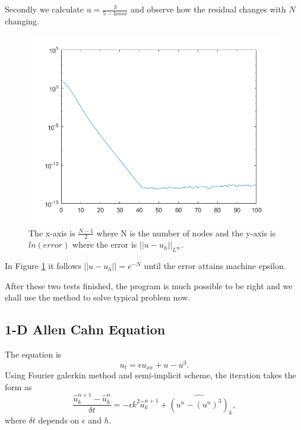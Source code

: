 \documentclass[a4paper]{article}
\begin{document}
Secondly we calculate $u=\frac{3}{5-4cosx}$ and observe how the residual changes with $N$ changing.
\begin{figure}[h]
    \centering
    \includegraphics[scale=0.5]{convergence.png}
    \caption{The x-axis is $\frac{N-1}{2}$ where N is the number of nodes and the y-axis is $ln(error)$ where the error is $||u-u_h||_{L^\infty}$.}
    \label{im::convergence}
\end{figure}

In Figure \ref{im::convergence} it follows $||u-u_h||=e^{-N}$ until the error attains machine epsilon.

After these two tests finished, the program is much possible to be right and we shall use the method to solve typical problem now.

\subsection{1-D Allen Cahn Equation}
The equation is
\begin{equation}
    u_t=\epsilon u_{xx}+u-u^3.
\end{equation}
Using Fourier galerkin method and semi-implicit scheme, the iteration takes the form as
\begin{equation}
    \frac{\hat{u}_k^{n+1}-\hat{u}_k^n}{\delta t}=-\epsilon k^2\hat{u}_k^{n+1}+\hat{(u^n-(u^n)^3)}_k,
\end{equation}
where $\delta t$ depends on $\epsilon$ and $h$.
\end{document}
